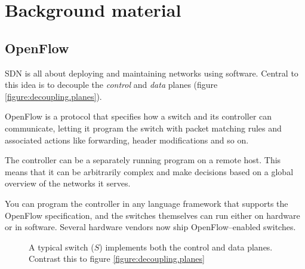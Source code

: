 \chapter{Background material}

\section{OpenFlow}

\acf{SDN} is all about deploying and maintaining networks using software.
Central to this idea is to decouple the \textit{control} and \textit{data}
planes (figure \ref{figure:decoupling.planes}).

OpenFlow is a protocol that specifies how a switch and its controller can
communicate, letting it program the switch with packet matching rules and
associated actions like forwarding, header modifications and so on.

The controller can be a separately running program on a remote host. This
means that it can be arbitrarily complex and make decisions based on a
global overview of the networks it serves.

You can program the controller in any language framework that supports the
OpenFlow specification, and the switches themselves can run either on
hardware or in software.  Several hardware vendors now ship
OpenFlow--enabled switches.

\begin{figure}
  \centering
  \caption{A typical switch ($S$) implements both the control and data planes.
           Contrast this to figure \vref{figure:decoupling.planes}}
  \label{coupled.planes}
\end{figure}

